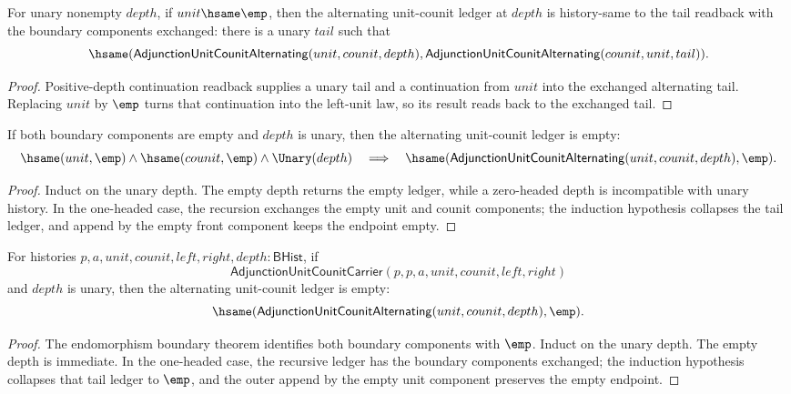 \begin{theorem}
\label{thm:adjunction-alternating-positive-depth-unit-empty-readback}
For unary nonempty $depth$, if $unit\hsame\emp$, then the alternating
unit-counit ledger at $depth$ is history-same to the tail readback with the
boundary components exchanged: there is a unary $tail$ such that
$$
\hsame(\mathsf{AdjunctionUnitCounitAlternating}(unit,counit,depth),
\mathsf{AdjunctionUnitCounitAlternating}(counit,unit,tail)).
$$
\end{theorem}
\begin{proof}
Positive-depth continuation readback supplies a unary tail and a continuation
from $unit$ into the exchanged alternating tail. Replacing $unit$ by $\emp$
turns that continuation into the left-unit law, so its result reads back to
the exchanged tail.
\end{proof}

\begin{theorem}
\label{thm:adjunction-unit-counit-alternating-empty-components-closed}
If both boundary components are empty and $depth$ is unary, then the
alternating unit-counit ledger is empty:
$$
\hsame(unit,\emp)\land\hsame(counit,\emp)\land\Unary(depth)
\quad\Longrightarrow\quad
\hsame(\mathsf{AdjunctionUnitCounitAlternating}(unit,counit,depth),\emp).
$$
\end{theorem}
\begin{proof}
Induct on the unary depth. The empty depth returns the empty ledger, while a
zero-headed depth is incompatible with unary history. In the one-headed case,
the recursion exchanges the empty unit and counit components; the induction
hypothesis collapses the tail ledger, and append by the empty front component
keeps the endpoint empty.
\end{proof}

\begin{theorem}
\label{thm:adjunction-unit-counit-alternating-endomorphism-empty}
For histories $p,a,unit,counit,left,right,depth:\mathsf{BHist}$, if
$$
\mathsf{AdjunctionUnitCounitCarrier}(p,p,a,unit,counit,left,right)
$$
and $depth$ is unary, then the alternating unit-counit ledger is empty:
$$
\hsame(\mathsf{AdjunctionUnitCounitAlternating}(unit,counit,depth),\emp).
$$
\end{theorem}
\begin{proof}
The endomorphism boundary theorem identifies both boundary components with
$\emp$. Induct on the unary depth. The empty depth is immediate. In the
one-headed case, the recursive ledger has the boundary components exchanged;
the induction hypothesis collapses that tail ledger to $\emp$, and the
outer append by the empty unit component preserves the empty endpoint.
\end{proof}

